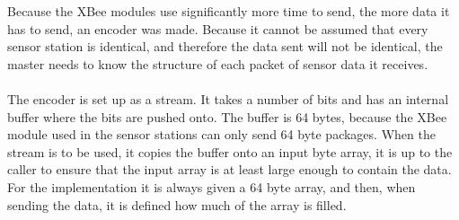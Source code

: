 Because the XBee modules use significantly more time to send, the more data it has to send, an encoder was made. Because it cannot be assumed that every sensor station is identical, and therefore the data sent will not be identical, the master needs to know the structure of each packet of sensor data it receives.
\\\\
The encoder is set up as a stream. It takes a number of bits and has an internal buffer where the bits are pushed onto. The buffer is 64 bytes, because the XBee module used in the sensor stations can only send 64 byte packages. When the stream is to be used, it copies the buffer onto an input byte array, it is up to the caller to ensure that the input array is at least large enough to contain the data. For the implementation it is always given a 64 byte array, and then, when sending the data, it is defined how much of the array is filled.
